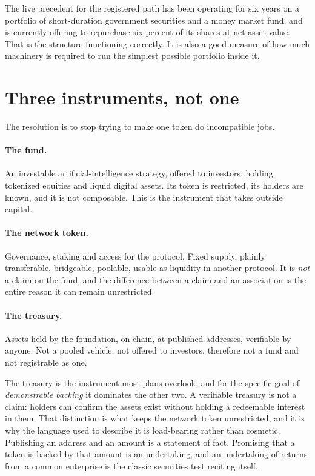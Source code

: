 \documentclass[11pt,a4paper]{article}
\begin{document}
The live precedent for the registered path has been operating for six years on a
portfolio of short-duration government securities and a money market fund, and is
currently offering to repurchase six percent of its shares at net asset value.
That is the structure functioning correctly. It is also a good measure of how much
machinery is required to run the simplest possible portfolio inside it.

\section{Three instruments, not one}

The resolution is to stop trying to make one token do incompatible jobs.

\paragraph{The fund.} An investable artificial-intelligence strategy, offered to
investors, holding tokenized equities and liquid digital assets. Its token is
restricted, its holders are known, and it is not composable. This is the
instrument that takes outside capital.

\paragraph{The network token.} Governance, staking and access for the protocol.
Fixed supply, plainly transferable, bridgeable, poolable, usable as liquidity in
another protocol. It is \emph{not} a claim on the fund, and the difference between
a claim and an association is the entire reason it can remain unrestricted.

\paragraph{The treasury.} Assets held by the foundation, on-chain, at published
addresses, verifiable by anyone. Not a pooled vehicle, not offered to investors,
therefore not a fund and not registrable as one.

The treasury is the instrument most plans overlook, and for the specific goal of
\emph{demonstrable backing} it dominates the other two. A verifiable treasury is
not a claim: holders can confirm the assets exist without holding a redeemable
interest in them. That distinction is what keeps the network token unrestricted,
and it is why the language used to describe it is load-bearing rather than
cosmetic. Publishing an address and an amount is a statement of fact. Promising
that a token is backed by that amount is an undertaking, and an undertaking of
returns from a common enterprise is the classic securities test reciting itself.
\end{document}
